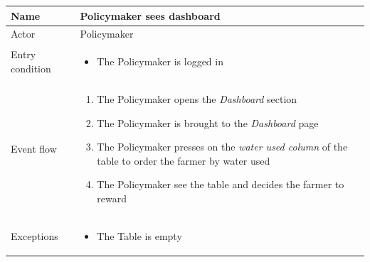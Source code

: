 \begin{table}[H]
    \begin{tabu} to \textwidth {|X|X[4]|}
        \hline
        Name            & Policymaker sees dashboard  \\ \hline
        Actor           & Policymaker                \\ \hline
        Entry condition & \begin{itemize}
            \item The Policymaker is logged in
        \end{itemize} \\ \hline
        Event flow      & \begin{enumerate}
            \item The Policymaker opens the \emph{Dashboard} section
            \item The Policymaker is brought to the \emph{Dashboard} page 
            \item The Policymaker presses on the \emph{water used column} of the table to order the farmer by water used 
            \item The Policymaker see the table and decides the farmer to reward
        \end{enumerate} \\ \hline
        Exceptions      & \begin{itemize}
            \item The Table is empty
        \end{itemize} \\ \hline
    \end{tabu}
\end{table}

\newpage

